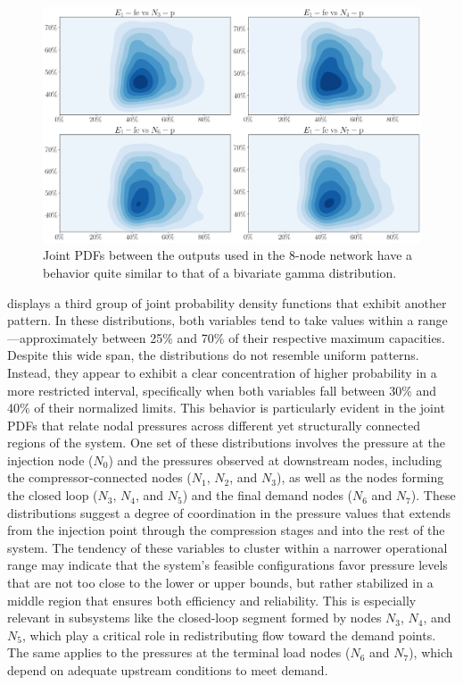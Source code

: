 \begin{figure}[H]
    \begin{center}
        \includegraphics[width=.75\textwidth]{figures/Chapter_NonLinealCensnet/outputs_outputs_1.png}
    \end{center}
    \caption{Joint PDFs between the outputs used in the 8-node network have a behavior quite similar to that of a bivariate gamma distribution.}
    \label{fig:joint_distributions_output_output_1}
\end{figure}







 displays a third group of joint probability density functions that exhibit another pattern. In these distributions, both variables tend to take values within a range—approximately between 25\% and 70\% of their respective maximum capacities. Despite this wide span, the distributions do not resemble uniform patterns. Instead, they appear to exhibit a clear concentration of higher probability in a more restricted interval, specifically when both variables fall between 30\% and 40\% of their normalized limits. This behavior is particularly evident in the joint PDFs that relate nodal pressures across different yet structurally connected regions of the system. One set of these distributions involves the pressure at the injection node ($N_0$) and the pressures observed at downstream nodes, including the compressor-connected nodes ($N_1$, $N_2$, and $N_3$), as well as the nodes forming the closed loop ($N_3$, $N_4$, and $N_5$) and the final demand nodes ($N_6$ and $N_7$). These distributions suggest a degree of coordination in the pressure values that extends from the injection point through the compression stages and into the rest of the system. The tendency of these variables to cluster within a narrower operational range may indicate that the system's feasible configurations favor pressure levels that are not too close to the lower or upper bounds, but rather stabilized in a middle region that ensures both efficiency and reliability. This is especially relevant in subsystems like the closed-loop segment formed by nodes $N_3$, $N_4$, and $N_5$, which play a critical role in redistributing flow toward the demand points. The same applies to the pressures at the terminal load nodes ($N_6$ and $N_7$), which depend on adequate upstream conditions to meet demand.


